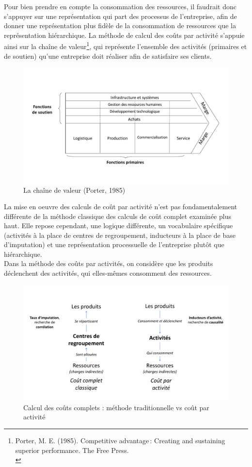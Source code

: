 \documentclass{tufte-handout}
\begin{document}
\begin{enumerate}
Pour bien prendre en compte la consommation des ressources, il faudrait donc s'appuyer sur une représentation qui part des processus de l'entreprise, afin de donner une représentation plus fidèle de la consommation de ressources que la représentation hiérarchique. La méthode de calcul des coûts par activité s'appuie ainsi sur la chaîne de valeur\footnote{Porter, M. E. (1985). Competitive advantage : Creating and sustaining superior performance. The Free Press.\\}, qui représente l'ensemble des activités (primaires et de soutien) qu'une entreprise doit réaliser afin de satisfaire ses clients.\\

\begin{figure}[htbp]
\centering
\includegraphics[width=.9\linewidth]{./img/chaine.pdf}
\caption{La chaîne de valeur (Porter, 1985)}
\end{figure}

La mise en oeuvre des calculs de coût par activité n'est pas fondamentalement différente de la méthode classique des calculs de coût complet examinée plus haut. Elle repose cependant, une logique différente, un vocabulaire spécifique (activités à la place de centres de regroupement, inducteurs à la place de base d'imputation) et une représentation processuelle de l’entreprise plutôt que hiérarchique.\\

Dans la méthode des coûts par activités, on considère que les produits déclenchent des activités, qui elles-mêmes consomment des ressources.\\

\begin{figure}[htbp]
\centering
\includegraphics[width=.9\linewidth]{./img/abc.pdf}
\caption{Calcul des coûts complets : méthode traditionnelle vs coût par activité}
\end{figure}


\end{enumerate}
\end{document}

